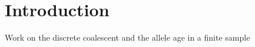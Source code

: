 \documentclass[]{article}
\begin{document}
\section{Introduction}
\label{sec:intro}

Work on the discrete coalescent and the allele age in a finite sample
\end{document}
